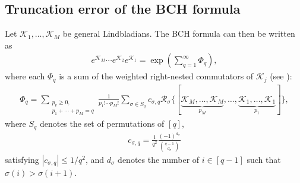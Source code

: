 \documentclass[11pt]{article}
\newcommand{\mc}{\mathcal}
\begin{document}
\subsection{Truncation error of the BCH formula}
\label{sec:bch-truncate}
Let $\mc K_1, \ldots, \mc K_M$ be general Lindbladians. The BCH formula can then be written as
\begin{align}
\label{eq:def-bch}
 	e^{\mc K_M}\cdots e^{\mc K_2}e^{\mc K_1} = \exp(\sum_{q = 1}^{\infty} \Phi_q),
\end{align}
where each $\Phi_q$ is a sum of the weighted right-nested commutators of $\mc K_j$ (see \citet{arnal2021note}):
\begin{align}
\label{eq:bch}
 	\Phi_q = \sum_{\substack{p_v \ge 0,\\p_1+\cdots+p_M = q}}\frac{1}{p_1!\cdots p_M!} \sum_{\sigma\in S_q} c_{\sigma, q}\mc R_{\sigma}\{[\underbrace{\mc K_M, \ldots, \mc K_M}_{p_M}, \ldots, \underbrace{\mc K_1, \ldots, \mc K_1}_{p_1}]\},
\end{align}
where $S_q$ denotes the set of permutations of $[q]$, \begin{align}
\label{eq:def-c-sigma}
    c_{\sigma, q}=\frac{1}{q^2}\frac{(-1)^{d_{\sigma}}}{\binom{q-1}{d_\sigma}} 
\end{align} satisfying $|c_{\sigma, q}|\le 1/q^2$, and $d_{\sigma}$ denotes the number of $i\in[q-1]$ such that $\sigma(i)>\sigma(i+1)$.
\end{document}
